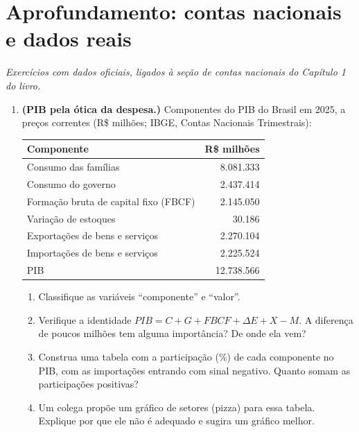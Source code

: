 \documentclass[11pt]{article}
\begin{document}
\bigskip
{}
\section*{Aprofundamento: contas nacionais e dados reais}
\noindent\textit{Exercícios com dados oficiais, ligados à seção de contas nacionais do Capítulo 1 do livro.}

\begin{enumerate}[label=\textbf{A\arabic*.}, leftmargin=*]
\item \textbf{(PIB pela ótica da despesa.)} Componentes do PIB do Brasil em 2025, a preços correntes (R\$ milhões; IBGE, Contas Nacionais Trimestrais):
\begin{center}
\begin{tabular}{lr}
\toprule
Componente & R\$ milhões \\
\midrule
Consumo das famílias & 8.081.333 \\
Consumo do governo & 2.437.414 \\
Formação bruta de capital fixo (FBCF) & 2.145.050 \\
Variação de estoques & 30.186 \\
Exportações de bens e serviços & 2.270.104 \\
Importações de bens e serviços & 2.225.524 \\
\midrule
PIB & 12.738.566 \\
\bottomrule
\end{tabular}
\end{center}
\begin{enumerate}[label=(\alph*)]
  \item Classifique as variáveis ``componente'' e ``valor''.
  \item Verifique a identidade $PIB = C + G + FBCF + \Delta E + X - M$. A diferença de poucos milhões tem alguma importância? De onde ela vem?
  \item Construa uma tabela com a participação (\%) de cada componente no PIB, com as importações entrando com sinal negativo.
    Quanto somam as participações positivas?
  \item Um colega propõe um gráfico de setores (pizza) para essa tabela. Explique por que ele não é adequado e sugira um gráfico melhor.
\end{enumerate}


\end{enumerate}
\end{document}
